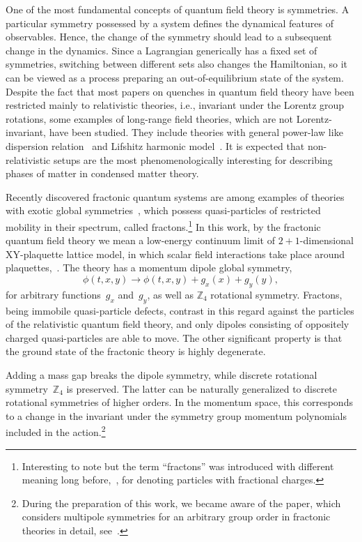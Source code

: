 \documentclass[a4paper,12pt]{article}
\newcommand{\be}{\begin{equation}}
\newcommand{\ee}{\end{equation}}
\newcommand{\nn}{\nonumber}
\newcommand{\Z}[1]{\mathbb{Z}_{#1}}
\begin{document}
One of the most fundamental concepts of quantum field theory is symmetries. A particular symmetry possessed by a system defines the dynamical features of observables. Hence, the change of the symmetry should lead to a subsequent change in the dynamics. Since a Lagrangian generically has a fixed set of symmetries, switching between different sets also changes the Hamiltonian, so it can be viewed as a process preparing an out-of-equilibrium state of the system. Despite the fact that most papers on quenches in quantum field theory have been restricted mainly to relativistic theories, i.e., invariant under the Lorentz group rotations, some examples of long-range field theories, which are not Lorentz-invariant, have been studied. They include theories with general power-law like dispersion relation~\cite{Rajabpour:2014osa} and Lifshitz harmonic model~\cite{MohammadiMozaffar:2018vmk, MohammadiMozaffar:2019gpn}. It is expected that non-relativistic setups are the most phenomenologically interesting for describing phases of matter in condensed matter theory.

Recently discovered fractonic quantum systems are among examples of theories with exotic global symmetries~\cite{Vijay:2015mka, Pretko:2018jbi, Gromov2019towards, Radzihovsky:2019jdo, Seiberg:2019vrp, Seiberg:2020bhn, Distler:2021bop, Bulmash:2023msp}, 
which possess quasi-particles of restricted mobility in their spectrum, called fractons.\footnote{Interesting to note but the term ``fractons'' was introduced with different meaning long before,~\cite{Khlopov1981fractionally}, for denoting particles with fractional charges.} In this work, by the fractonic quantum field theory we mean a low-energy continuum limit of $2 + 1$-dimensional XY-plaquette lattice model, in which scalar field interactions take place around plaquettes,~\cite{Paramekanti2002ring, Seiberg:2020bhn}. The theory has a momentum dipole global symmetry,
\be\nn
    \phi(t, x, y) \to \phi(t, x, y) + g_x(x) + g_y(y),
\ee
for arbitrary functions~$g_x$ and~$g_y$, as well as $\Z4$ rotational symmetry. Fractons, being immobile quasi-particle defects, contrast in this regard against the particles of the relativistic quantum field theory, and only dipoles consisting of oppositely charged quasi-particles are able to move. The other significant property is that the ground state of the fractonic theory is highly degenerate.

Adding a mass gap breaks the dipole symmetry, while discrete rotational symmetry~$\Z4$ is preserved. The latter can be naturally generalized to discrete rotational symmetries of higher orders. In the momentum space, this corresponds to a change in the invariant under the symmetry group momentum polynomials included in the action.\footnote{During the preparation of this work, we became aware of the paper, which considers multipole symmetries for an arbitrary group order in fractonic theories in detail, see~\cite{Bulmash:2023msp}.}
\end{document}
